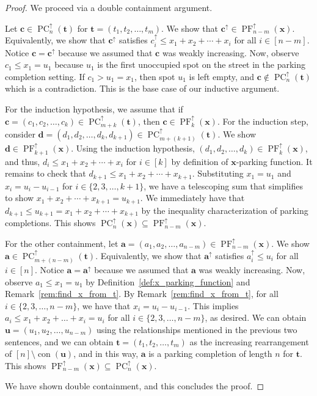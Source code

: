 \documentclass{amsart}
\theoremstyle{definition}
\numberwithin{equation}{section}
\newcommand{\PF}{\operatorname{PF}} %
\newcommand{\PC}{\operatorname{PC}} %
\begin{document}
\begin{proof}
    We proceed via a double containment argument.

    Let $\mathbf{c} \in \PC_n^\uparrow(\mathbf{t})$ for $\mathbf{t} = (t_1, t_2, \hdots, t_m)$.
    We show that $\mathbf{c}^\uparrow \in \PF_{n-m}^\uparrow(\mathbf{x})$.
    Equivalently, we show that $\mathbf{c}^\uparrow$ satisfies $c_i^\uparrow \leq x_1 + x_2 + \cdots + x_i$ for all $i \in [n-m]$.
    Notice $\mathbf{c} = \mathbf{c}^\uparrow$ because we assumed that $\mathbf{c}$ was weakly increasing.
    Now, observe $c_1 \leq x_1 = u_1$ because $u_1$ is the first unoccupied spot on the street in the parking completion setting.
    If $c_1 > u_1 = x_1$, then spot $u_1$ is left empty, and $\mathbf{c} \notin \PC_{n}^\uparrow(\mathbf{t})$ which is a contradiction.
    This is the base case of our inductive argument.
    
    For the induction hypothesis, we assume that if $\mathbf{c} = (c_1, c_2, \hdots, c_k) \in \PC_{m+k}^\uparrow(\mathbf{t})$, then $\mathbf{c} \in \PF_{k}^\uparrow(\mathbf{x})$.
    For the induction step, consider $\mathbf{d} = (d_1, d_2, \hdots, d_k, d_{k+1}) \in \PC_{m+(k+1)}^\uparrow(\mathbf{t})$.
    We show $\mathbf{d} \in \PF_{k+1}^\uparrow(\mathbf{x})$.
    Using the induction hypothesis, $(d_1, d_2, \hdots, d_k) \in \PF_{k}^\uparrow(\mathbf{x})$, and thus, $d_i \leq x_1 + x_2 + \cdots + x_i$ for $i \in [k]$ by definition of $\mathbf{x}$-parking function.
    It remains to check that $d_{k+1} \leq x_1 + x_2 + \cdots + x_{k+1}$.
    Substituting $x_1 = u_1$ and $x_i = u_{i} - u_{i-1}$ for $i \in \{2, 3, \ldots, k+1\}$, we have a telescoping sum that simplifies to show $x_1 + x_2 + \cdots + x_{k+1} = u_{k+1}$.
    We immediately have that $d_{k+1} \leq u_{k+1} = x_1 + x_2 + \cdots + x_{k+1}$ by the inequality characterization of parking completions.
    This shows $\PC_{n}^\uparrow(\mathbf{x}) \subseteq \PF_{n-m}^\uparrow(\mathbf{x})$.

    For the other containment, let $\mathbf{a} = (a_1, a_2, \hdots, a_{n-m}) \in \PF_{n-m}^\uparrow(\mathbf{x})$.
    We show $\mathbf{a} \in \PC_{m+(n-m)}^\uparrow(\mathbf{t})$.
    Equivalently, we show that $\mathbf{a}^\uparrow$ satisfies $a_i^{\uparrow} \leq u_i$ for all $i \in [n]$.
    Notice $\mathbf{a} = \mathbf{a}^\uparrow$ because we assumed that $\mathbf{a}$ was weakly increasing.
    Now, observe $a_1 \leq x_1 = u_1$ by Definition~\ref{def:x_parking_function} and Remark~\ref{rem:find_x_from_t}.
    By Remark~\ref{rem:find_x_from_t}, for all $i \in \{2, 3, \hdots, n-m\}$, we have that $x_i = u_i - u_{i-1}$.
    This implies $a_i \leq x_1 + x_2 + \hdots + x_i = u_i$ for all $i \in \{ 2, 3, \hdots, n-m \}$, as desired.
    We can obtain $\mathbf{u} = (u_1, u_2, \hdots, u_{n-m})$ using the relationships mentioned in the previous two sentences, and we can obtain $\mathbf{t} = (t_1, t_2, \hdots, t_m)$ as the increasing rearrangement of $[n] \setminus \operatorname{con}(\mathbf{u})$, and in this way, $\mathbf{a}$ is a parking completion of length $n$ for $\mathbf{t}$.
    This shows $\PF_{n-m}^\uparrow(\mathbf{x}) \subseteq \PC_{n}^\uparrow(\mathbf{x})$.

    We have shown double containment, and this concludes the proof.
\end{proof}
\end{document}
